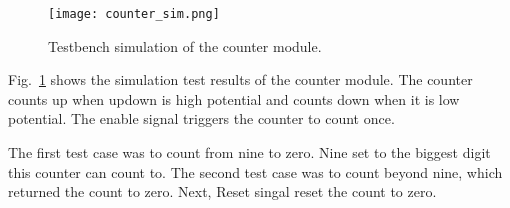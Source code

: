 \begin{figure}[htbp]
   \centerline{
   \texttt{[image: counter\_sim.png]}}
   \caption{Testbench simulation of the counter module.}
   \label{fig:counter_sim}
\end{figure}

Fig.~\ref{fig:counter_sim} shows the simulation test results of the counter module. The counter counts up when updown is high potential and counts down when it is low potential. The enable signal triggers the counter to count once.

The first test case was to count from nine to zero. Nine set to the biggest digit this counter can count to. The second test case was to count beyond nine, which returned the count to zero. Next, Reset singal reset the count to zero.
